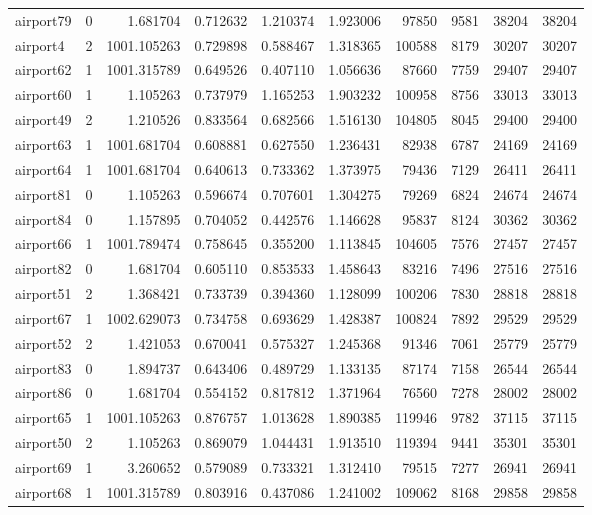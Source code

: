 \begin{longtable}{|l|r|r|r|r|r|r|r|r|r|}
airport79 & 0 & 1.681704 & 0.712632 & 1.210374 & 1.923006 & 97850 & 9581 & 38204 & 38204 \\
airport4 & 2 & 1001.105263 & 0.729898 & 0.588467 & 1.318365 & 100588 & 8179 & 30207 & 30207 \\
airport62 & 1 & 1001.315789 & 0.649526 & 0.407110 & 1.056636 & 87660 & 7759 & 29407 & 29407 \\
airport60 & 1 & 1.105263 & 0.737979 & 1.165253 & 1.903232 & 100958 & 8756 & 33013 & 33013 \\
airport49 & 2 & 1.210526 & 0.833564 & 0.682566 & 1.516130 & 104805 & 8045 & 29400 & 29400 \\
airport63 & 1 & 1001.681704 & 0.608881 & 0.627550 & 1.236431 & 82938 & 6787 & 24169 & 24169 \\
airport64 & 1 & 1001.681704 & 0.640613 & 0.733362 & 1.373975 & 79436 & 7129 & 26411 & 26411 \\
airport81 & 0 & 1.105263 & 0.596674 & 0.707601 & 1.304275 & 79269 & 6824 & 24674 & 24674 \\
airport84 & 0 & 1.157895 & 0.704052 & 0.442576 & 1.146628 & 95837 & 8124 & 30362 & 30362 \\
airport66 & 1 & 1001.789474 & 0.758645 & 0.355200 & 1.113845 & 104605 & 7576 & 27457 & 27457 \\
airport82 & 0 & 1.681704 & 0.605110 & 0.853533 & 1.458643 & 83216 & 7496 & 27516 & 27516 \\
airport51 & 2 & 1.368421 & 0.733739 & 0.394360 & 1.128099 & 100206 & 7830 & 28818 & 28818 \\
airport67 & 1 & 1002.629073 & 0.734758 & 0.693629 & 1.428387 & 100824 & 7892 & 29529 & 29529 \\
airport52 & 2 & 1.421053 & 0.670041 & 0.575327 & 1.245368 & 91346 & 7061 & 25779 & 25779 \\
airport83 & 0 & 1.894737 & 0.643406 & 0.489729 & 1.133135 & 87174 & 7158 & 26544 & 26544 \\
airport86 & 0 & 1.681704 & 0.554152 & 0.817812 & 1.371964 & 76560 & 7278 & 28002 & 28002 \\
airport65 & 1 & 1001.105263 & 0.876757 & 1.013628 & 1.890385 & 119946 & 9782 & 37115 & 37115 \\
airport50 & 2 & 1.105263 & 0.869079 & 1.044431 & 1.913510 & 119394 & 9441 & 35301 & 35301 \\
airport69 & 1 & 3.260652 & 0.579089 & 0.733321 & 1.312410 & 79515 & 7277 & 26941 & 26941 \\
airport68 & 1 & 1001.315789 & 0.803916 & 0.437086 & 1.241002 & 109062 & 8168 & 29858 & 29858 \\

\end{longtable}
